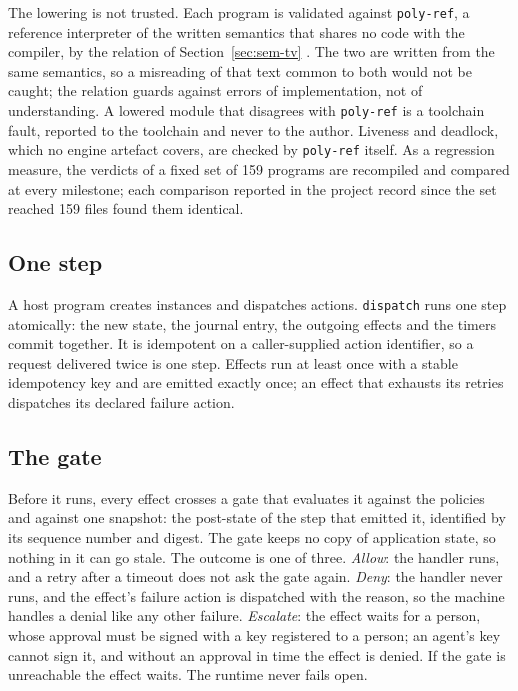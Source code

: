 \documentclass[11pt]{article}
\begin{document}
The lowering is not trusted. Each program is validated against \texttt{poly-ref}, a reference interpreter of the written semantics that shares no code with the compiler, by the relation of Section~\ref{sec:sem-tv} \cite{pnueli1998tv}. The two are written from the same semantics, so a misreading of that text common to both would not be caught; the relation guards against errors of implementation, not of understanding. A lowered module that disagrees with \texttt{poly-ref} is a toolchain fault, reported to the toolchain and never to the author. Liveness and deadlock, which no engine artefact covers, are checked by \texttt{poly-ref} itself. As a regression measure, the verdicts of a fixed set of 159 programs are recompiled and compared at every milestone; each comparison reported in the project record since the set reached 159 files found them identical.

\subsection{One step}

A host program creates instances and dispatches actions. \texttt{dispatch} runs one step atomically: the new state, the journal entry, the outgoing effects and the timers commit together. It is idempotent on a caller-supplied action identifier, so a request delivered twice is one step. Effects run at least once with a stable idempotency key and are emitted exactly once; an effect that exhausts its retries dispatches its declared failure action.

\subsection{The gate}

Before it runs, every effect crosses a gate that evaluates it against the policies and against one snapshot: the post-state of the step that emitted it, identified by its sequence number and digest. The gate keeps no copy of application state, so nothing in it can go stale. The outcome is one of three. \emph{Allow}: the handler runs, and a retry after a timeout does not ask the gate again. \emph{Deny}: the handler never runs, and the effect's failure action is dispatched with the reason, so the machine handles a denial like any other failure. \emph{Escalate}: the effect waits for a person, whose approval must be signed with a key registered to a person; an agent's key cannot sign it, and without an approval in time the effect is denied. If the gate is unreachable the effect waits. The runtime never fails open.
\end{document}
